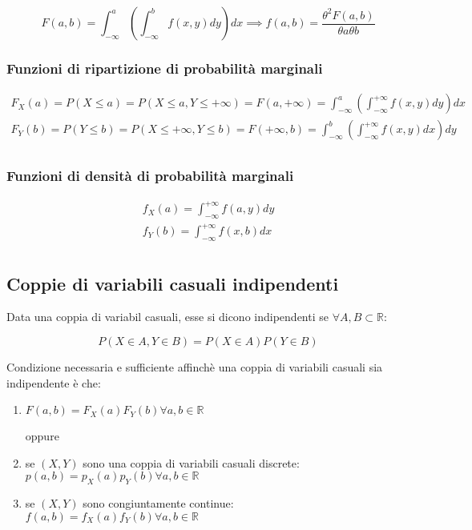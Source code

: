 \documentclass{article}
\begin{document}
$$
F(a,b) = \int^a_{-\infty} (\int^b_{-\infty} f(x,y) dy) dx \implies f(a,b) = \frac{\theta^2 F(a,b)}{\theta a \theta b}
$$

\subsubsection{Funzioni di ripartizione di probabilità marginali}

$$
\begin{matrix}
F_X(a) = P(X \leq a) = P(X \leq a, Y\leq+\infty) = F(a,+\infty) = \int^a_{-\infty} (\int^{+\infty}_{-\infty} f(x,y) dy) dx \\
F_Y(b) = P(Y \leq b) = P(X\leq+\infty, Y \leq b) = F(+\infty,b) = \int^b_{-\infty} (\int^{+\infty}_{-\infty} f(x,y) dx) dy \\
\end{matrix}
$$

\subsubsection{Funzioni di densità di probabilità marginali}

$$
\begin{matrix}
f_X(a) = \int^{+\infty}_{-\infty} f(a,y) dy \\
f_Y(b) = \int^{+\infty}_{-\infty} f(x,b) dx \\
\end{matrix}
$$

\subsection{Coppie di variabili casuali indipendenti}

Data una coppia di variabil casuali, esse si dicono indipendenti se $\forall A,B \subset \mathbb{R}$:

$$
P(X \in A, Y \in B) = P(X \in A)P(Y \in B)
$$

\noindent
Condizione necessaria e sufficiente affinchè una coppia di variabili casuali sia indipendente è che:

\begin{enumerate}
    \item $F(a,b) = F_X(a)F_Y(b) \forall a,b \in \mathbb{R}$

    oppure

    \item se $(X,Y)$ sono una coppia di variabili casuali discrete: $p(a,b) = p_X(a)p_Y(b) \forall a,b \in \mathbb{R}$
    \item se $(X,Y)$ sono congiuntamente continue: $f(a,b) = f_X(a)f_Y(b) \forall a,b \in \mathbb{R}$
\end{enumerate}
\end{document}
